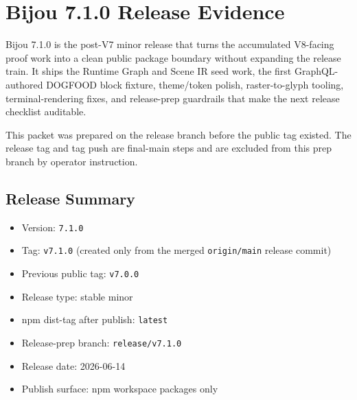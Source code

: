 \chapter{Bijou 7.1.0 Release Evidence}\label{record-260}

\smallskip

Bijou 7.1.0 is the post-V7 minor release that turns the accumulated V8-facing proof work into a clean public package boundary without expanding the release train. It ships the Runtime Graph and Scene IR seed work, the first GraphQL-authored DOGFOOD block fixture, theme/token polish, raster-to-glyph tooling, terminal-rendering fixes, and release-prep guardrails that make the next release checklist auditable.

This packet was prepared on the release branch before the public tag existed. The release tag and tag push are final-main steps and are excluded from this prep branch by operator instruction.

\section{Release Summary}\label{record-260-release-summary}

\begin{itemize}
\tightlist
\item
  Version: \texttt{7\allowbreak{}.\allowbreak{}1\allowbreak{}.\allowbreak{}0}
\item
  Tag: \texttt{v\allowbreak{}7\allowbreak{}.\allowbreak{}1\allowbreak{}.\allowbreak{}0} (created only from the merged \texttt{o\allowbreak{}r\allowbreak{}i\allowbreak{}g\allowbreak{}i\allowbreak{}n\allowbreak{}/\allowbreak{}m\allowbreak{}a\allowbreak{}i\allowbreak{}n} release commit)
\item
  Previous public tag: \texttt{v\allowbreak{}7\allowbreak{}.\allowbreak{}0\allowbreak{}.\allowbreak{}0}
\item
  Release type: stable minor
\item
  npm dist-tag after publish: \texttt{l\allowbreak{}a\allowbreak{}t\allowbreak{}e\allowbreak{}s\allowbreak{}t}
\item
  Release-prep branch: \texttt{r\allowbreak{}e\allowbreak{}l\allowbreak{}e\allowbreak{}a\allowbreak{}s\allowbreak{}e\allowbreak{}/\allowbreak{}v\allowbreak{}7\allowbreak{}.\allowbreak{}1\allowbreak{}.\allowbreak{}0}
\item
  Release date: 2026-06-14
\item
  Publish surface: npm workspace packages only
\end{itemize}

